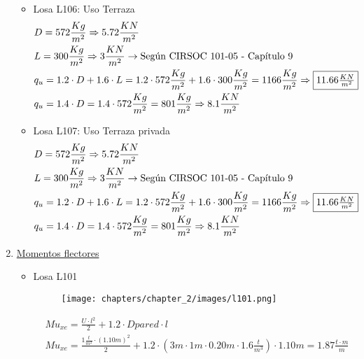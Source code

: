 \begin{enumerate}
\begin{itemize}
\item Losa L106: Uso Terraza
\begin{align*}
& D = 572 \frac{Kg}{m^2} \Rightarrow 5.72 \frac{KN}{m^2} \\
& L = 300 \frac{Kg}{m^2} \Rightarrow 3 \frac{KN}{m^2} \rightarrow \text{Según CIRSOC 101-05 - Capítulo 9}\\
& q_u = 1.2 \cdot D + 1.6 \cdot L = 1.2 \cdot 572 \frac{Kg}{m^2} + 1.6 \cdot 300 \frac{Kg}{m^2} = 1166 \frac{Kg}{m^2} \Rightarrow \framebox{$11.66 \frac{KN}{m^2}$} \\
& q_u = 1.4 \cdot D = 1.4 \cdot 572 \frac{Kg}{m^2} = 801 \frac{Kg}{m^2} \Rightarrow 8.1 \frac{KN}{m^2}
\end{align*}

\item Losa L107: Uso Terraza privada
\begin{align*}
& D = 572 \frac{Kg}{m^2} \Rightarrow 5.72 \frac{KN}{m^2} \\
& L = 300 \frac{Kg}{m^2} \Rightarrow 3 \frac{KN}{m^2} \rightarrow \text{Según CIRSOC 101-05 - Capítulo 9}\\
& q_u = 1.2 \cdot D + 1.6 \cdot L = 1.2 \cdot 572 \frac{Kg}{m^2} + 1.6 \cdot 300 \frac{Kg}{m^2} = 1166 \frac{Kg}{m^2} \Rightarrow \framebox{$11.66 \frac{KN}{m^2}$} \\
& q_u = 1.4 \cdot D = 1.4 \cdot 572 \frac{Kg}{m^2} = 801 \frac{Kg}{m^2} \Rightarrow 8.1 \frac{KN}{m^2}
\end{align*}

\end{itemize}


\item \underline{Momentos flectores}\\
\begin{itemize}
\item Losa L101

\begin{figure}[H]
\begin{center}
     \texttt{[image: chapters/chapter\_2/images/l101.png]}
\end{center}
\end{figure}

\begin{align*}
& Mu_{xe} = \frac{U \cdot l^2}{2} +1.2 \cdot Dpared \cdot l \\
& Mu_{xe} = \frac{1 \frac{t}{m^2} \cdot (1.10m)^2}{2} + 1.2 \cdot (3m \cdot 1m \cdot 0.20m \cdot 1.6 \frac{t}{m^3}) \cdot 1.10m = 1.87 \frac{t \cdot m}{m}
\end{align*}


\end{itemize}
\end{enumerate}
